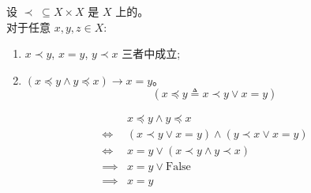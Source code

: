 \begin{frame}{}
  \begin{theorem}
    设 $\prec\; \subseteq X \times X$ 是 $X$ 上的。\\[5pt]
    对于任意 $x, y, z \in X$: \\[6pt]
    \begin{enumerate}[(1)]
      \setlength{\itemsep}{6pt}
      \item $x \prec y$, $x = y$, $y \prec x$ 三者中成立;
      \item $(x \preceq y \land y \preceq x) \to x = y$。
        \[
          (x \preceq y \triangleq x \prec y \lor x = y)
        \]
    \end{enumerate}
  \end{theorem}

  \pause
  \begin{align*}
    & x \preceq y \land y \preceq x \\[5pt]
    \iff & (x \prec y \lor x = y) \land (y \prec x \lor x = y) \\[5pt]
    \iff & x = y \lor (x \prec y \land y \prec x) \\[5pt]
    \implies & x = y \lor \text{False} \\[5pt]
    \implies & x = y
  \end{align*}
\end{frame}
